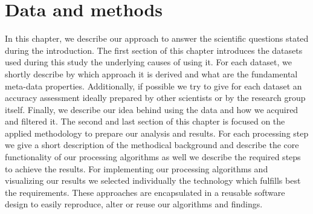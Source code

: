 \chapter{Data and methods}
\label{ch:datamethods}
	In this chapter, we describe our approach to answer the scientific questions stated during the introduction. The first section of this chapter introduces the datasets used during this study the underlying causes of using it. For each dataset, we shortly describe by which approach it is derived and what are the fundamental meta-data properties. Additionally, if possible we try to give for each dataset an accuracy assessment ideally prepared by other scientists or by the research group itself. Finally, we describe our idea behind using the data and how we acquired and filtered it. The second and last section of this chapter is focused on the applied methodology to prepare our analysis and results. For each processing step we give a short description of the methodical background and describe the core functionality of our processing algorithms as well we describe the required steps to achieve the results. For implementing our processing algorithms and visualizing our results we selected individually the technology which fulfills best the requirements. These approaches are encapsulated in a reusable software design to easily reproduce, alter or reuse our algorithms and findings.

